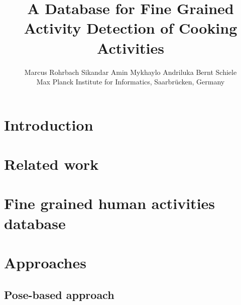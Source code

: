 \documentclass[10pt,twocolumn,letterpaper]{article}
\begin{document}

\title{A Database for Fine Grained Activity Detection of Cooking Activities}
\newcommand{\authSpace}{\hspace{15mm}}
\author{
 Marcus Rohrbach \authSpace Sikandar Amin  \authSpace Mykhaylo Andriluka \authSpace  Bernt Schiele\\
Max Planck Institute for Informatics, Saarbr{\"u}cken, Germany\\\vspace{-0.6cm}
 }

\maketitle
\thispagestyle{fancy}
\begin{abstract}
   
\end{abstract}

 \vspace{-0.25cm}
\section{Introduction}
\label{sec:cvpr12:intro}


\section{Related work}
\label{sec:cvpr12:related}


\section{Fine grained human activities database}
\label{sec:cvpr12:database}


\section{Approaches}
\label{sec:cvpr12:approaches}
 

\subsection{Pose-based approach}
\label{sec:cvpr12:approach:pose}


\end{document}
